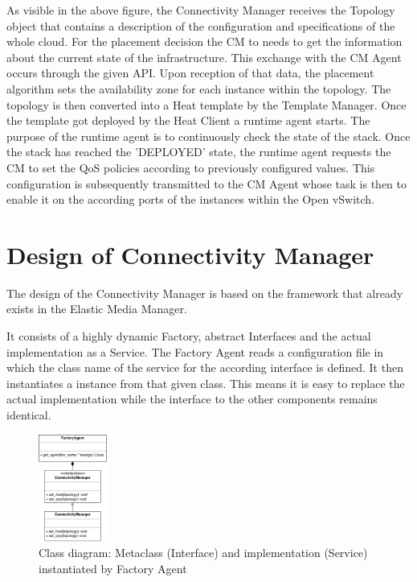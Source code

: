 As visible in the above figure, the Connectivity Manager receives the Topology object that contains a description of the configuration and specifications of the whole cloud. For the placement decision the CM to needs to get the information about the current state of the infrastructure. This exchange with the CM Agent occurs through the given API. Upon reception of that data, the placement algorithm sets the availability zone for each instance within the topology. The topology is then converted into a Heat template by the Template Manager. Once the template got deployed by the Heat Client a runtime agent starts. The purpose of the runtime agent is to continuously check the state of the stack. Once the stack has reached the 'DEPLOYED' state, the runtime agent requests the CM to set the QoS policies according to previously configured values. This configuration is subsequently transmitted to the CM Agent whose task is then to enable it on the according ports of the instances within the Open vSwitch.


\section{Design of Connectivity Manager}

The design of the Connectivity Manager is based on the framework that already exists in the Elastic Media Manager.

It consists of a highly dynamic Factory, abstract Interfaces and the actual implementation as a Service.
The Factory Agent reads a configuration file in which the class name of the service for the according interface is defined. It then instantiates a instance from that given class. This means it is easy to replace the actual implementation while the interface to the other components remains identical.

\begin{figure}[H]
\centering

\includegraphics[width=0.2\textwidth]{images/design/cm-emm_interface_classes}

\caption{Class diagram: Metaclass (Interface) and implementation (Service) instantiated by Factory Agent}
\end{figure}

